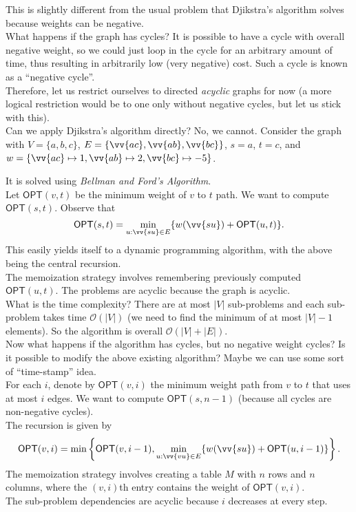 This is slightly different from the usual problem that Djikstra's algorithm solves because weights can be negative.\\
What happens if the graph has cycles? It is possible to have a cycle with overall negative weight, so we could just loop in the cycle for an arbitrary amount of time, thus resulting in arbitrarily low (very negative) cost. Such a cycle is known as a ``negative cycle''.\\
Therefore, let us restrict ourselves to directed \textit{acyclic} graphs for now (a more logical restriction would be to one only without negative cycles, but let us stick with this).\\

Can we apply Djikstra's algorithm directly? No, we cannot. Consider the graph with $V=\{a,b,c\}$, $E=\{\vv{ac},\vv{ab},\vv{bc}\}$, $s=a$, $t=c$, and $w=\{\vv{ac}\mapsto 1, \vv{ab}\mapsto 2, \vv{bc}\mapsto-5\}$.

It is solved using \textit{Bellman and Ford's Algorithm}.\\
Let $\mathsf{OPT}(v,t)$ be the minimum weight of $v$ to $t$ path. We want to compute $\mathsf{OPT}(s,t)$.
Observe that
\[ \mathsf{OPT}(s,t) = \min_{u: \vv{su}\in E} \{ w(\vv{su}) + \mathsf{OPT}(u,t) \}. \]
This easily yields itself to a dynamic programming algorithm, with the above being the central recursion.\\
The memoization strategy involves remembering previously computed $\mathsf{OPT}(u,t)$.
The problems are acyclic because the graph is acyclic.\\
What is the time complexity? There are at most $|V|$ sub-problems and each sub-problem takes time $\mathcal{O}(|V|)$ (we need to find the minimum of at most $|V|-1$ elements). So the algorithm is overall $\mathcal{O}(|V|+|E|)$.\\

Now what happens if the algorithm has cycles, but no negative weight cycles? Is it possible to modify the above existing algorithm? Maybe we can use some sort of ``time-stamp'' idea.\\
For each $i$, denote by $\mathsf{OPT}(v,i)$ the minimum weight path from $v$ to $t$ that uses at most $i$ edges. We want to compute $\mathsf{OPT}(s,n-1)$ (because all cycles are non-negative cycles).\\
The recursion is given by
\begin{equation}
	\label{eqn: bellman and ford}
	\mathsf{OPT}(v,i) = \min \left\{ \mathsf{OPT}(v,i-1), \min_{u: \vv{vu}\in E} \{ w(\vv{su}) + \mathsf{OPT}(u,i-1)\} \right\}.
\end{equation}
The memoization strategy involves creating a table $M$ with $n$ rows and $n$ columns, where the $(v,i)$th entry contains the weight of $\mathsf{OPT}(v,i)$.\\
The sub-problem dependencies are acyclic because $i$ decreases at every step.\\

